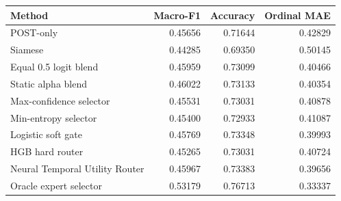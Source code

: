\begin{tabular}{lrrr}
\toprule
Method & Macro-F1 & Accuracy & Ordinal MAE \\
\midrule
POST-only & 0.45656 & 0.71644 & 0.42829 \\
Siamese & 0.44285 & 0.69350 & 0.50145 \\
Equal 0.5 logit blend & 0.45959 & 0.73099 & 0.40466 \\
Static alpha blend & 0.46022 & 0.73133 & 0.40354 \\
Max-confidence selector & 0.45531 & 0.73031 & 0.40878 \\
Min-entropy selector & 0.45400 & 0.72933 & 0.41087 \\
Logistic soft gate & 0.45769 & 0.73348 & 0.39993 \\
HGB hard router & 0.45265 & 0.73031 & 0.40724 \\
Neural Temporal Utility Router & 0.45967 & 0.73383 & 0.39656 \\
Oracle expert selector & 0.53179 & 0.76713 & 0.33337 \\
\bottomrule
\end{tabular}
